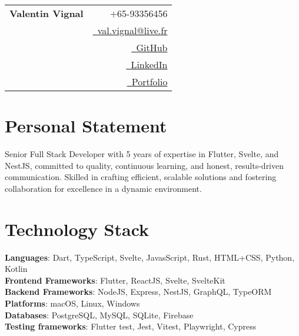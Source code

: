 \documentclass[a4paper,11pt]{article}
\makeatletter
\newcommand{\name}{Valentin Vignal}
\newcommand{\email}{val.vignal@live.fr}
\makeatother
\begin{document}

{
\begin{tabularx}{\linewidth}{L r}                                                                                                 \\  \textbf{\Large \name} & {\raisebox{0.0\height}{\footnotesize \faPhone}\ +65-93356456}                                                  \\
   & \href{mailto:\email}{\raisebox{0.0\height}{\footnotesize \faEnvelope}\ {\email}}                               \\
   & \href{https://github.com/ValentinVignal}{\raisebox{0.0\height}{\footnotesize \faGithub}\ {GitHub}}             \\
   & \href{https://www.linkedin.com/feed/}{\raisebox{0.0\height}{\footnotesize \faLinkedin}\ {LinkedIn}}            \\
   & \href{https://valentinvignal.github.io/portfolio/}{\raisebox{0.0\height}{\footnotesize \faGlobe}\ {Portfolio}} \\
\end{tabularx}
}


\section{\textbf{Personal Statement}}
Senior Full Stack Developer with 5 years
of expertise in Flutter, Svelte, and NestJS, committed to quality, continuous
learning, and honest, results-driven communication. Skilled in crafting
efficient, scalable solutions and fostering collaboration for excellence in a
dynamic environment.



\section{\textbf{Technology Stack}}
\begin{itemize}[leftmargin=0.05in, label={}]
  \small{\item{
        \textbf{Languages}{: Dart, TypeScript, Svelte, JavasScript, Rust, HTML+CSS, Python, Kotlin } \\
        \textbf{Frontend Frameworks}{: Flutter, ReactJS, Svelte, SvelteKit} \\
        \textbf{Backend Frameworks}{: NodeJS, Express, NestJS, GraphQL, TypeORM} \\
        \textbf{Platforms}{: macOS, Linux, Windows} \\
        \textbf{Databases}{: PostgreSQL, MySQL, SQLite, Firebase} \\
        \textbf{Testing frameworks}{: Flutter test, Jest, Vitest, Playwright, Cypress} \\

        }}
\end{itemize}
\end{document}
